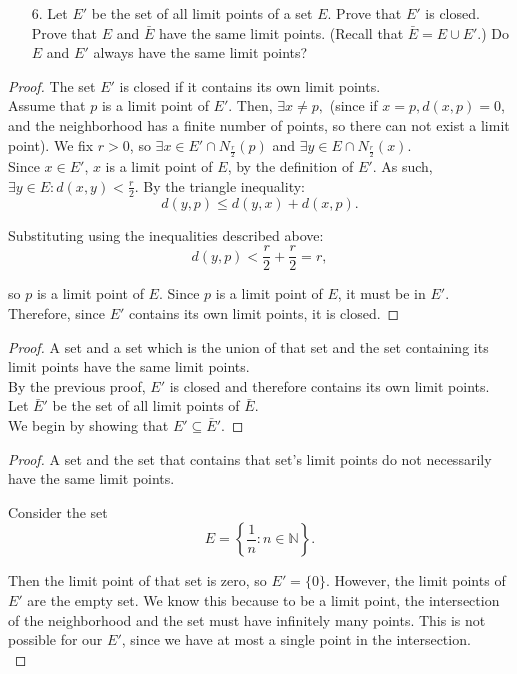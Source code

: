 \documentclass[10pt]{article}
\theoremstyle{definition}
\theoremstyle{plain}
\newcommand{\N}{\mathbb{N}}
\begin{document}
\pagebreak



\begin{enumerate}
\item[6.] Let $E'$ be the set of all limit points of a set $E$. Prove that $E'$ is closed. Prove that $E$ and $\bar{E}$ have the same limit points. (Recall that $\bar{E} = E \cup E'.$) Do $E$ and $E'$ always have the same limit points?
\end{enumerate}

\begin{proof}
The set $E'$ is closed if it contains its own limit points. \\

Assume that $p$ is a limit point of $E'$. Then, $\exists x\neq p,$ (since if $x=p, d(x,p)=0$, and the neighborhood has a finite number of points, so there can not exist a limit point). We fix $r>0$, so $\exists x\in E'\cap N_{\frac{r}{2}}(p)$ and $\exists y\in E \cap N_{\frac{r}{2}}(x)$. \\

Since $x\in E'$, $x$ is a limit point of $E$, by the definition of $E'$. As such, $\exists y\in E: d(x,y) < \frac{r}{2}$. By the triangle inequality:
$$d(y,p) \leq d(y,x) + d(x,p).$$

Substituting using the inequalities described above:
$$d(y,p) < \frac{r}{2}+\frac{r}{2} =r,$$

so $p$ is a limit point of $E$. Since $p$ is a limit point of $E$, it must be in $E'$. Therefore, since $E'$ contains its own limit points, it is closed.
\end{proof}

\begin{proof}
A set and a set which is the union of that set and the set containing its limit points have the same limit points. \\

By the previous proof, $E'$ is closed and therefore contains its own limit points. \\

Let $\bar{E}'$ be the set of all limit points of $\bar{E}$. \\

We begin by showing that $E'\subseteq \bar{E}'$.

\end{proof}

\begin{proof}
  A set and the set that contains that set's limit points do not necessarily have the same limit points.

  Consider the set
  $$E = \left\{\frac{1}{n}: n\in\N\right\}.$$

  Then the limit point of that set is zero, so $E' = \{0\}$. However, the limit points of $E'$ are the empty set. We know this because to be a limit point, the intersection of the neighborhood and the set must have infinitely many points. This is not possible for our $E'$, since we have at most a single point in the intersection. \\
\end{proof}
\end{document}
